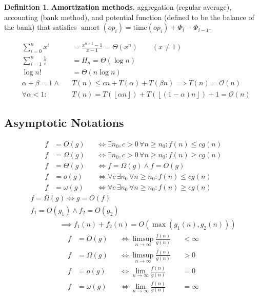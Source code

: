 \documentclass[]{article}
\newcommand\compactsubsection[1]        {\vspace{-10pt}\subsection{#1}\vspace{-6pt}}
\theoremstyle{definition}
\newtheorem{Definition}{\color{defiColor}Definition}
\newcommand\oc    {\mathcal{O}}
\newcommand\rf    {\right\rfloor}
\newcommand\lf    {\left\lfloor}
\newcommand\floor [1] {\lf #1 \rf}
\renewcommand\inf {\infty}
\newcommand\co        {\colon}
\newcommand\ag        {\alpha}
\newcommand\bg        {\beta}
\newcommand\logn      {\log n}
\newcommand\dequad    {\!\!\!\!\!\!}
\DeclareMathOperator\amort   {amort}
\begin{document}
\begin{multicols}{4}
\begin{Definition}
				\textbf{Amortization methods. }aggregation (regular average), accounting (bank method), and potential function (defined to be the balance of the bank) that satisfies $\amort(op_i) = \mathrm{time}(op_i) + \Phi_i - \Phi_{i - 1}$. 
			\end{Definition}
			\vspace{-14pt}\begin{alignat*}{9}
				&\textstyle\sum_{i = 0}^{n} x^i          &&= \tfrac{x^{n + 1} - 1}{x - 1} = \Theta(x^n)  \quad\quad(x \neq 1) \\
				&\textstyle\sum_{i = 1}^{n} \tfrac{1}{i} &&= H_n = \Theta(\logn) \\
				&\textstyle\log n!                       &&= \Theta(n\logn) \\
				&\textstyle \ag + \bg = 1 \land          &&T(n) \le cn + T(\ag) + T(\bg n) \implies T(n) = \oc(n) \\
				&\textstyle \forall \ag < 1 \co          &&T(n) = T(\floor{\ag n}) + T(\floor{(1 - \ag)n}) + 1 = \oc(n)
			\end{alignat*}\vspace{-10pt}
			
			\vspace{-4pt}
			\compactsubsection{Asymptotic Notations}
			\vspace{-5pt}
			\begin{alignat*}{9}
				f &= O(g) &&\iff \exists n_0, c > 0\, \forall n \ge n_0\co f(n) \le c g(n) \\
				f &= \Omega(g) &&\iff \exists n_0, c > 0\, \forall n \ge n_0\co f(n) \ge c g(n) \\
				f &= \Theta(g) &&\iff f = \Omega(g) \land f = O(g) \\
				f &= o(g) &&\iff \forall c\, \exists n_0\, \forall n \ge n_0\co f(n) \le cg(n) \\
				f &= \omega(g) &&\iff \forall c\, \exists n_0\, \forall n \ge n_0\co f(n) \ge cg(n)
			\end{alignat*}
			\vspace{-15pt}
			\begin{gather*}
				f = \Omega(g) \iff g = O(f) \\
				\dequad f_1 = O(g_1) \land f_2 = O(g_2)\quad\quad\quad\quad  \\ \quad\quad\quad\quad  \implies f_1(n) + f_2(n) = O(\max(g_1(n), g_2(n)))
			\end{gather*}
			\vspace{-15pt}
			\begin{alignat*}{9}
				f &= O(g)      &&\iff \limsup_{n \to \inf} \textstyle \frac{f(n)}{g(n)} &&< \inf \\
				f &= \Omega(g) &&\iff \limsup_{n \to \inf} \textstyle \frac{f(n)}{g(n)} &&> 0 \\
				f &= o(g)      &&\iff \lim_{n \to \inf}    \textstyle \frac{f(n)}{g(n)} &&= 0 \\
				f &= \omega(g) &&\iff \lim_{n \to \inf}    \textstyle \frac{f(n)}{g(n)} &&= \inf
			\end{alignat*}
			

\end{multicols}
\end{document}
